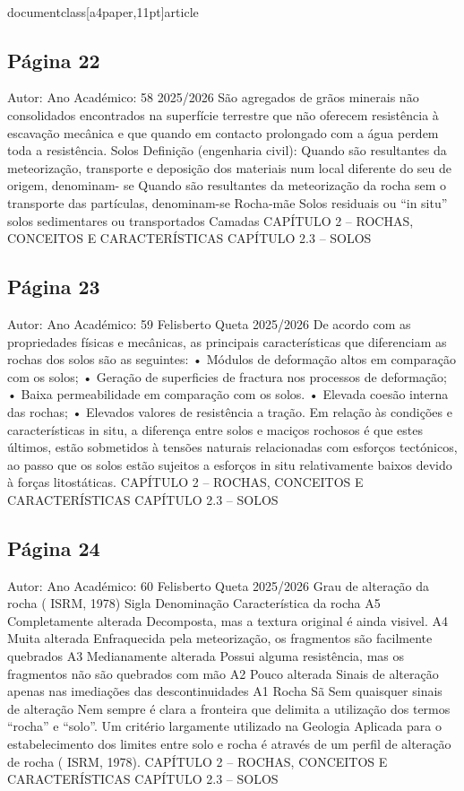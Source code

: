 \\documentclass[a4paper,11pt]{article}
\begin{document}
\subsection*{Página 22}
Autor:
Ano Académico:
58
2025/2026
São agregados de grãos minerais não consolidados encontrados na superfície terrestre que não oferecem 
resistência à escavação mecânica e que quando em contacto prolongado com a água perdem toda a resistência.
Solos
Definição (engenharia civil):
Quando
são
resultantes
da
meteorização,
transporte
e deposição dos materiais num
local diferente do seu de origem, denominam-
se
Quando são resultantes da meteorização da
rocha
sem
o
transporte
das
partículas,
denominam-se
Rocha-mãe
Solos residuais ou “in situ”
solos sedimentares ou transportados
Camadas
CAPÍTULO 2 – ROCHAS, CONCEITOS E CARACTERÍSTICAS
CAPÍTULO 2.3 – SOLOS 



\subsection*{Página 23}
Autor:
Ano Académico:
59
Felisberto Queta
2025/2026
De acordo com as propriedades físicas e mecânicas, as principais características que 
diferenciam as rochas dos solos são as seguintes:
• Módulos de deformação altos em comparação com os solos; 
• Geração de superficies de fractura nos processos de deformação;
• Baixa permeabilidade em comparação com os solos.  
• Elevada coesão interna das rochas;
• Elevados valores de resistência a tração.
Em relação às condições e características in situ, a diferença entre solos e maciços rochosos é 
que estes últimos, estão sobmetidos à tensões naturais relacionadas com esforços tectónicos, ao
passo que os solos estão sujeitos a esforços in situ relativamente baixos devido à forças
litostáticas. 
CAPÍTULO 2 – ROCHAS, CONCEITOS E CARACTERÍSTICAS
CAPÍTULO 2.3 – SOLOS 



\subsection*{Página 24}
Autor:
Ano Académico:
60
Felisberto Queta
2025/2026
Grau de alteração da rocha ( ISRM, 1978)
Sigla
Denominação
Característica da rocha
A5
Completamente
alterada
Decomposta, mas a textura original é ainda visivel. 
A4
Muita alterada
Enfraquecida pela meteorização, os fragmentos são 
facilmente quebrados
A3
Medianamente
alterada
Possui alguma resistência, mas os fragmentos não 
são quebrados com mão
A2
Pouco alterada
Sinais de alteração apenas nas imediações das 
descontinuidades
A1
Rocha Sã
Sem quaisquer sinais de alteração
Nem sempre é clara a fronteira que delimita a utilização dos termos “rocha” e “solo”.
Um critério largamente utilizado na Geologia Aplicada para o estabelecimento dos limites entre 
solo e rocha é através de um perfil de alteração de rocha ( ISRM, 1978). 
CAPÍTULO 2 – ROCHAS, CONCEITOS E CARACTERÍSTICAS
CAPÍTULO 2.3 – SOLOS 
\end{document}
